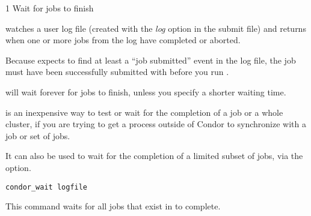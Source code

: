 \begin{ManPage}{\label{man-condor-wait}}{1}
{Wait for jobs to finish}

\Synopsis
{}
\ToolArgsBase

\ToolArgsBase
{}



\Description

 watches a user log file (created with the \emph{log}
option in the submit file) and returns when one or more jobs from the
log have completed or aborted.

Because  expects to find at least a ``job submitted''
event in the log file, the job must have been successfully submitted
with  before you run .

 will wait forever for jobs to finish, unless you
specify a shorter waiting time.

\begin{Options}
    \ToolArgsBaseDesc

\end{Options}

\GenRem 

 is an inexpensive way to test or wait for the completion
of a job or a whole cluster, if you are trying to get a process
outside of Condor to synchronize with a job or set of jobs.

It can also be used to wait for the completion of a limited subset of
jobs, via the  option.

\Examples

\begin{verbatim}
condor_wait logfile
\end{verbatim}
This command waits for all jobs that exist in  to complete.


\end{ManPage}
